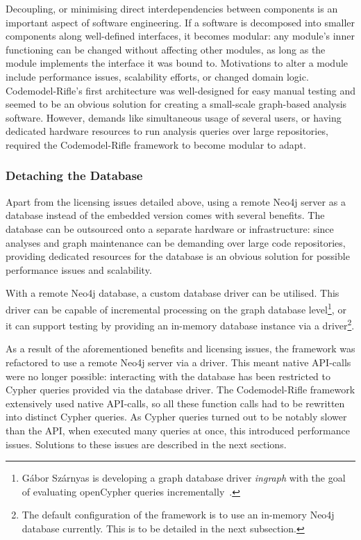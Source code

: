 Decoupling, or minimising direct interdependencies between components is an important aspect of software engineering. If a software is decomposed into smaller components along well-defined interfaces, it becomes modular: any module's inner functioning can be changed without affecting other modules, as long as the module implements the interface it was bound to. Motivations to alter a module include performance issues, scalability efforts, or changed domain logic. Codemodel-Rifle's first architecture was well-designed for easy manual testing and seemed to be an obvious solution for creating a small-scale graph-based analysis software. However, demands like simultaneous usage of several users, or having dedicated hardware resources to run analysis queries over large repositories, required the Codemodel-Rifle framework to become modular to adapt.


\subsubsection{Detaching the Database}

Apart from the licensing issues detailed above, using a remote Neo4j server as a database instead of the embedded version comes with several benefits. The database can be outsourced onto a separate hardware or infrastructure: since analyses and graph maintenance can be demanding over large code repositories, providing dedicated resources for the database is an obvious solution for possible performance issues and scalability.

With a remote Neo4j database, a custom database driver can be utilised. This driver can be capable of incremental processing on the graph database level\footnote{Gábor Szárnyas is developing a graph database driver \emph{ingraph} with the goal of evaluating openCypher queries incrementally~\cite{ingraph-github}.}, or it can support testing by providing an in-memory database instance via a driver\footnote{The default configuration of the framework is to use an in-memory Neo4j database currently. This is to be detailed in the next subsection.}.

As a result of the aforementioned benefits and licensing issues, the framework was refactored to use a remote Neo4j server via a driver. This meant native API-calls were no longer possible: interacting with the database has been restricted to Cypher queries provided via the database driver. The Codemodel-Rifle framework extensively used native API-calls, so all these function calls had to be rewritten into distinct Cypher queries. As Cypher queries turned out to be notably slower than the API, when executed many queries at once, this introduced performance issues. Solutions to these issues are described in the next sections.


